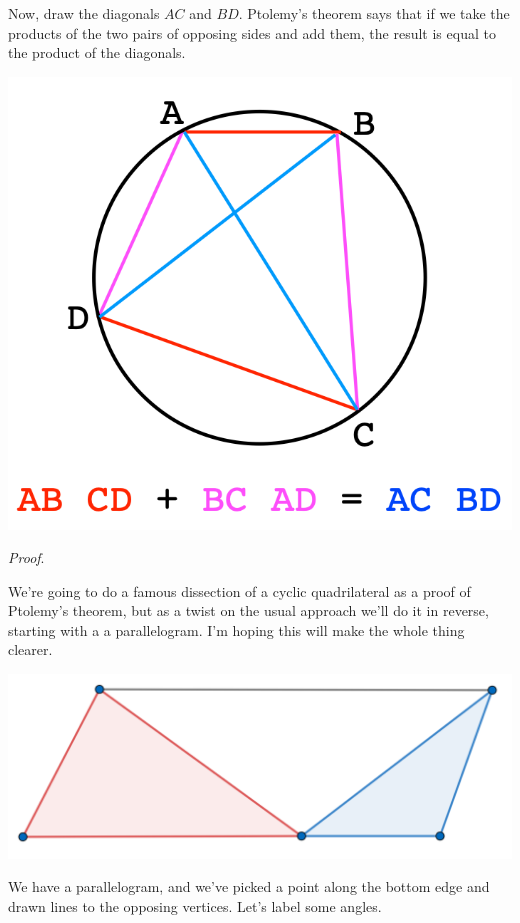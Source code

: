 \documentclass[11pt, oneside]{article}
\begin{document}
Now, draw the diagonals $AC$ and $BD$.  Ptolemy's theorem says that if we take the products of the two pairs of opposing sides and add them, the result is equal to the product of the diagonals.
\begin{center} \includegraphics [scale=0.6] {pt1.png} \end{center}
 
\emph{Proof}.

We're going to do a famous dissection of a cyclic quadrilateral as a proof of Ptolemy's theorem, but as a twist on the usual approach we'll do it in reverse, starting with a a parallelogram.  I'm hoping this will make the whole thing clearer.

\begin{center} \includegraphics [scale=0.2] {Ptol1.png} \end{center}

We have a parallelogram, and we've picked a point along the bottom edge and drawn lines to the opposing vertices.  Let's label some angles.
\end{document}
